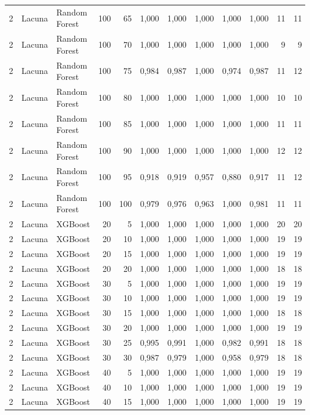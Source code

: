 \begin{longtable}{@{}rllrrrrrrrrr@{}}
2 & Lacuna & Random Forest & 100 & 65 & 1,000 & 1,000 & 1,000 & 1,000 & 1,000 & 11 & 11 \\
2 & Lacuna & Random Forest & 100 & 70 & 1,000 & 1,000 & 1,000 & 1,000 & 1,000 & 9 & 9 \\
2 & Lacuna & Random Forest & 100 & 75 & 0,984 & 0,987 & 1,000 & 0,974 & 0,987 & 11 & 12 \\
2 & Lacuna & Random Forest & 100 & 80 & 1,000 & 1,000 & 1,000 & 1,000 & 1,000 & 10 & 10 \\
2 & Lacuna & Random Forest & 100 & 85 & 1,000 & 1,000 & 1,000 & 1,000 & 1,000 & 11 & 11 \\
2 & Lacuna & Random Forest & 100 & 90 & 1,000 & 1,000 & 1,000 & 1,000 & 1,000 & 12 & 12 \\
2 & Lacuna & Random Forest & 100 & 95 & 0,918 & 0,919 & 0,957 & 0,880 & 0,917 & 11 & 12 \\
2 & Lacuna & Random Forest & 100 & 100 & 0,979 & 0,976 & 0,963 & 1,000 & 0,981 & 11 & 11 \\
2 & Lacuna & XGBoost & 20 & 5 & 1,000 & 1,000 & 1,000 & 1,000 & 1,000 & 20 & 20 \\
2 & Lacuna & XGBoost & 20 & 10 & 1,000 & 1,000 & 1,000 & 1,000 & 1,000 & 19 & 19 \\
2 & Lacuna & XGBoost & 20 & 15 & 1,000 & 1,000 & 1,000 & 1,000 & 1,000 & 19 & 19 \\
2 & Lacuna & XGBoost & 20 & 20 & 1,000 & 1,000 & 1,000 & 1,000 & 1,000 & 18 & 18 \\
2 & Lacuna & XGBoost & 30 & 5 & 1,000 & 1,000 & 1,000 & 1,000 & 1,000 & 19 & 19 \\
2 & Lacuna & XGBoost & 30 & 10 & 1,000 & 1,000 & 1,000 & 1,000 & 1,000 & 19 & 19 \\
2 & Lacuna & XGBoost & 30 & 15 & 1,000 & 1,000 & 1,000 & 1,000 & 1,000 & 18 & 18 \\
2 & Lacuna & XGBoost & 30 & 20 & 1,000 & 1,000 & 1,000 & 1,000 & 1,000 & 19 & 19 \\
2 & Lacuna & XGBoost & 30 & 25 & 0,995 & 0,991 & 1,000 & 0,982 & 0,991 & 18 & 18 \\
2 & Lacuna & XGBoost & 30 & 30 & 0,987 & 0,979 & 1,000 & 0,958 & 0,979 & 18 & 18 \\
2 & Lacuna & XGBoost & 40 & 5 & 1,000 & 1,000 & 1,000 & 1,000 & 1,000 & 19 & 19 \\
2 & Lacuna & XGBoost & 40 & 10 & 1,000 & 1,000 & 1,000 & 1,000 & 1,000 & 19 & 19 \\
2 & Lacuna & XGBoost & 40 & 15 & 1,000 & 1,000 & 1,000 & 1,000 & 1,000 & 19 & 19 \\

\end{longtable}
